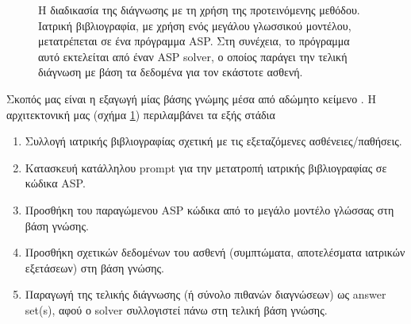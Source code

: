 \documentclass[10pt,leqno]{amsart}
\begin{document}
\begin{figure}[!h]
\begin{center}
\end{center}
    \caption{Η διαδικασία της διάγνωσης με τη χρήση της προτεινόμενης μεθόδου.
    Ιατρική βιβλιογραφία, με χρήση ενός μεγάλου γλωσσικού μοντέλου, μετατρέπεται σε ένα πρόγραμμα ASP.
    Στη συνέχεια, το πρόγραμμα αυτό εκτελείται από έναν ASP solver, ο οποίος παράγει την τελική διάγνωση
    με βάση τα δεδομένα για τον εκάστοτε ασθενή.}
    \label{fig:architecture}
\end{figure}

Σκοπός μας είναι η εξαγωγή μίας βάσης γνώμης μέσα από αδώμητο κείμενο \cite{ré2014feature}.
Η αρχιτεκτονική μας (σχήμα \ref{fig:architecture}) περιλαμβάνει τα εξής στάδια

\begin{enumerate}
    \item Συλλογή ιατρικής βιβλιογραφίας σχετική με τις εξεταζόμενες ασθένειες/παθήσεις.
    \item Κατασκευή κατάλληλου prompt για την μετατροπή ιατρικής βιβλιογραφίας σε κώδικα ASP.
    \item Προσθήκη του παραγώμενου ASP κώδικα από το μεγάλο μοντέλο γλώσσας στη βάση γνώσης.
    \item Προσθήκη σχετικών δεδομένων του ασθενή (συμπτώματα, αποτελέσματα ιατρικών εξετάσεων) στη βάση γνώσης.
    \item Παραγωγή της τελικής διάγνωσης (ή σύνολο πιθανών διαγνώσεων) ως answer set(s), αφού ο solver συλλογιστεί 
          πάνω στη τελική βάση γνώσης.
\end{enumerate}
\end{document}

